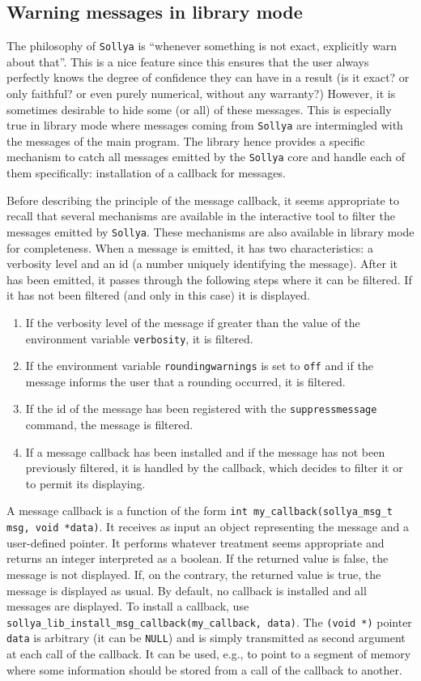 \documentclass[a4paper]{article}
\newcommand{\sollya}{\texttt{Sollya}\xspace}
\begin{document}
\subsection{Warning messages in library mode}
\label{callbacks}
The philosophy of \sollya is ``whenever something is not exact, explicitly warn about that''. This is a nice feature since this ensures that the user always perfectly knows the degree of confidence they can have in a result (is it exact? or only faithful? or even purely numerical, without any warranty?) However, it is sometimes desirable to hide some (or all) of these messages. This is especially true in library mode where messages coming from \sollya are intermingled with the messages of the main program. The library hence provides a specific mechanism to catch all messages emitted by the \sollya core and handle each of them specifically: installation of a callback for messages.

Before describing the principle of the message callback, it seems appropriate to recall that several mechanisms are available in the interactive tool to filter the messages emitted by \sollya. These mechanisms are also available in library mode for completeness. When a message is emitted, it has two characteristics: a verbosity level and an id (a number uniquely identifying the message). After it has been emitted, it passes through the following steps where it can be filtered. If it has not been filtered (and only in this case) it is displayed.
\begin{enumerate}
\item If the verbosity level of the message if greater than the value of the environment variable \verb|verbosity|, it is filtered.
\item If the environment variable \verb|roundingwarnings| is set to \verb|off| and if the message informs the user that a rounding occurred, it is filtered.
\item If the id of the message has been registered with the \verb|suppressmessage| command, the message is filtered.
\item If a message callback has been installed and if the message has not been previously filtered, it is handled by the callback, which decides to filter it or to permit its displaying.
\end{enumerate}

A message callback is a function of the form \verb|int my_callback(sollya_msg_t msg, void *data)|. It receives as input an object representing the message and a user-defined pointer. It performs whatever treatment seems appropriate and returns an integer interpreted as a boolean. If the returned value is false, the message is not displayed. If, on the contrary, the returned value is true, the message is displayed as usual. By default, no callback is installed and all messages are displayed. To install a callback, use \verb|sollya_lib_install_msg_callback(my_callback, data)|. The \verb|(void *)| pointer \verb|data| is arbitrary (it can be \verb|NULL|) and is simply transmitted as second argument at each call of the callback. It can be used, e.g., to point to a segment of memory where some information should be stored from a call of the callback to another.
\end{document}
